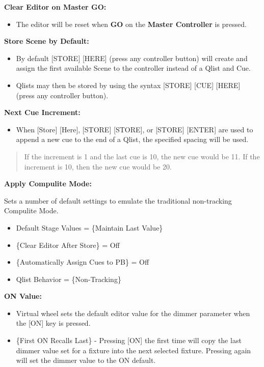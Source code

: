 \documentclass[
]{article}
\providecommand{\tightlist}{%
  \setlength{\itemsep}{0pt}\setlength{\parskip}{0pt}}
\begin{document}
\textbf{Clear Editor on Master GO:}

\begin{itemize}
\tightlist
\item
  The editor will be reset when \textbf{GO} on the \textbf{Master Controller} is pressed.
\end{itemize}

\textbf{Store Scene by Default:}

\begin{itemize}
\item
  By default {[}STORE{]} {[}HERE{]} (press any controller button) will create and assign the first available Scene to the controller instead of a Qlist and Cue.
\item
  Qlists may then be stored by using the syntax {[}STORE{]} {[}CUE{]} {[}HERE{]} (press any controller button).
\end{itemize}

\textbf{Next Cue Increment:}

\begin{itemize}
\tightlist
\item
  When {[}Store{]} {[}Here{]}, {[}STORE{]} {[}STORE{]}, or {[}STORE{]} {[}ENTER{]} are used to append a new cue to the end of a Qlist, the specified spacing will be used.
\end{itemize}

\begin{quote}
If the increment is 1 and the last cue is 10, the new cue would be 11. If the increment is 10, then the new cue would be 20.
\end{quote}

\textbf{Apply Compulite Mode:}

Sets a number of default settings to emulate the traditional non-tracking Compulite Mode.

\begin{itemize}
\item
  Default Stage Values = \{Maintain Last Value\}
\item
  \{Clear Editor After Store\} = Off
\item
  \{Automatically Assign Cues to PB\} = Off
\item
  Qlist Behavior = \{Non-Tracking\}
\end{itemize}

\textbf{ON Value:}

\begin{itemize}
\item
  Virtual wheel sets the default editor value for the dimmer parameter when the {[}ON{]} key is pressed.
\item
  {\{First ON Recalls Last\} - Pressing {[}ON{]} the first time will copy the last dimmer value set for a fixture into the next selected fixture. Pressing again will set the dimmer value to the ON default.}
\end{itemize}
\end{document}
